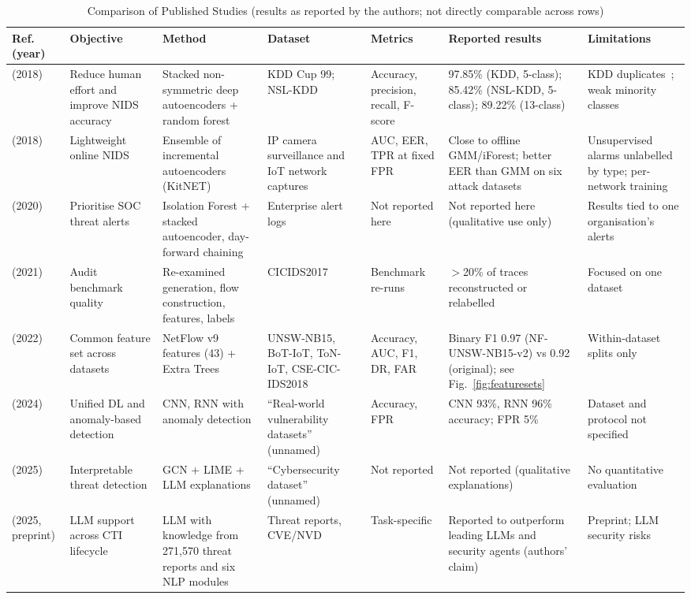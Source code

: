 \documentclass[conference]{IEEEtran}
\begin{document}
\begin{table}[t]
\caption{Comparison of Published Studies (results as reported by the authors; not directly comparable across rows)}
\label{tab:studies}
\centering
\footnotesize
\begin{tabularx}{\textwidth}{@{}p{1.75cm}p{2.5cm}YYp{1.7cm}Yp{3.0cm}@{}}
\toprule
\textbf{Ref. (year)} & \textbf{Objective} & \textbf{Method} & \textbf{Dataset} & \textbf{Metrics} & \textbf{Reported results} & \textbf{Limitations} \\
\midrule
\cite{shone2018deep} (2018) & Reduce human effort and improve NIDS accuracy & Stacked non-symmetric deep autoencoders + random forest & KDD Cup 99; NSL-KDD & Accuracy, precision, recall, F-score & 97.85\% (KDD, 5-class); 85.42\% (NSL-KDD, 5-class); 89.22\% (13-class) & KDD duplicates~\cite{tavallaee2009detailed}; weak minority classes \\
\cite{mirsky2018kitsune} (2018) & Lightweight online NIDS & Ensemble of incremental autoencoders (KitNET) & IP camera surveillance and IoT network captures & AUC, EER, TPR at fixed FPR & Close to offline GMM/iForest; better EER than GMM on six attack datasets & Unsupervised alarms unlabelled by type; per-network training \\
\cite{aminanto2020threat} (2020) & Prioritise SOC threat alerts & Isolation Forest + stacked autoencoder, day-forward chaining & Enterprise alert logs & Not reported here & Not reported here (qualitative use only) & Results tied to one organisation's alerts \\
\cite{engelen2021troubleshooting} (2021) & Audit benchmark quality & Re-examined generation, flow construction, features, labels & CICIDS2017 & Benchmark re-runs & $>$20\% of traces reconstructed or relabelled & Focused on one dataset \\
\cite{sarhan2022standard} (2022) & Common feature set across datasets & NetFlow v9 features (43) + Extra Trees & UNSW-NB15, BoT-IoT, ToN-IoT, CSE-CIC-IDS2018 & Accuracy, AUC, F1, DR, FAR & Binary F1 0.97 (NF-UNSW-NB15-v2) vs 0.92 (original); see Fig.~\ref{fig:featuresets} & Within-dataset splits only \\
\cite{rajendran2024cybersecurity} (2024) & Unified DL and anomaly-based detection & CNN, RNN with anomaly detection & ``Real-world vulnerability datasets'' (unnamed) & Accuracy, FPR & CNN 93\%, RNN 96\% accuracy; FPR 5\% & Dataset and protocol not specified \\
\cite{balaji2025explainable} (2025) & Interpretable threat detection & GCN + LIME + LLM explanations & ``Cybersecurity dataset'' (unnamed) & Not reported & Not reported (qualitative explanations) & No quantitative evaluation \\
\cite{liu2025cylens} (2025, preprint) & LLM support across CTI lifecycle & LLM with knowledge from 271,570 threat reports and six NLP modules & Threat reports, CVE/NVD & Task-specific & Reported to outperform leading LLMs and security agents (authors' claim) & Preprint; LLM security risks~\cite{greshake2023indirect} \\
\bottomrule
\end{tabularx}
\end{table}
\end{document}
